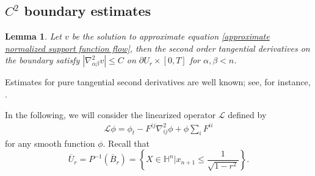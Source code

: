 \documentclass[reqno]{amsart}
\newtheorem{lemma}[theorem]{Lemma}
\theoremstyle{remark}
\theoremstyle{definition}
\numberwithin{equation}{section}
\begin{document}
\subsection{\texorpdfstring{$C^2$}{C2} boundary estimates}

\begin{lemma}
    Let $v$ be the solution to approximate equation \eqref{approximate normalized support function flow}, then the second order tangential derivatives on the boundary satisfy $|\nabla^2_{\alpha \beta} v| \leqslant C$ on $\partial U_r \times [0, T]$ for $\alpha, \beta < n$.
\end{lemma}
Estimates for pure tangential second derivatives are well known; see, for instance, \cite[Theorem 6.1]{GuanBo}.

In the following, we will consider the linearized operator $\mathscr{L}$ defined by 
\begin{align*}
    \mathscr{L}\phi = \phi_t - F^{ij} \nabla^2_{ij}\phi + \phi \sum_i F^{ii}
\end{align*}
for any smooth function $\phi$. Recall that 
\[
\overline{U}_r = P^{-1}(\overline{B}_r) = \left\{ X \in \mathbb{H}^{n} | x_{n+1} \leqslant \frac{1}{\sqrt{1-r^2}} \right\}.
\]
\end{document}
